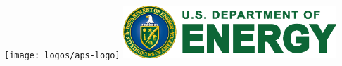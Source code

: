 \documentclass[portrait,final,paperwidth=120cm, paperheight=240cm,  fontscale=0.277]{baposter}
\begin{document}
\begin{poster}
{\vspace{1em}
\begin{centering}
	\texttt{[image: logos/aps-logo]}\hspace{5mm}
	\includegraphics[width=0.6\textwidth]{logos/DOE_logo_color_cmyk}
	
\end{centering}

}


\end{poster}%
%
\end{document}
